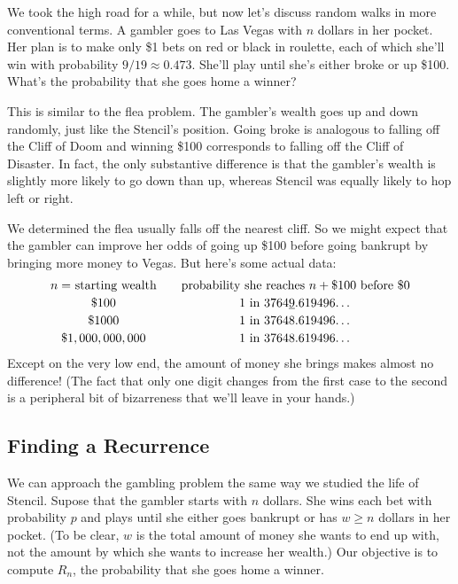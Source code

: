 We took the high road for a while, but now let's discuss random walks
in more conventional terms.  A gambler goes to Las Vegas with $n$
dollars in her pocket.  Her plan is to make only \$1 bets on red or
black in roulette, each of which she'll win with probability $9/19
\approx 0.473$.  She'll play until she's either broke or up \$100.
What's the probability that she goes home a winner?

This is similar to the flea problem.  The gambler's wealth goes up and
down randomly, just like the Stencil's position.  Going broke is
analogous to falling off the Cliff of Doom and winning \$100
corresponds to falling off the Cliff of Disaster.  In fact, the only
substantive difference is that the gambler's wealth is slightly more
likely to go down than up, whereas Stencil was equally likely to hop
left or right.

We determined the flea usually falls off the nearest cliff.  So we
might expect that the gambler can improve her odds of going up \$100
before going bankrupt by bringing more money to Vegas.  But here's
some actual data:
%
\[
\begin{array}{c@{\qquad}c}
\text{$n =$ starting wealth} &
\text{probability she reaches $n + \$100$ before \$0} \\[0.5ex]
\$100 & \text{1 in 3764\underline{9}.619496\ldots} \\[0.5ex]
\$1000 & \text{1 in 37648.619496\ldots} \\[0.5ex]
\$1,000,000,000 & \text{1 in 37648.619496\ldots}
\end{array}
\]
%
Except on the very low end, the amount of money she brings makes
almost no difference!  (The fact that only one digit changes from the
first case to the second is a peripheral bit of bizarreness that we'll
leave in your hands.)

\subsection{Finding a Recurrence}

We can approach the gambling problem the same way we studied the life
of Stencil.  Supose that the gambler starts with $n$ dollars.  She
wins each bet with probability $p$ and plays until she either goes
bankrupt or has $w \geq n$ dollars in her pocket.  (To be clear, $w$
is the total amount of money she wants to end up with, not the amount
by which she wants to increase her wealth.)  Our objective is to
compute $R_n$, the probability that she goes home a winner.

